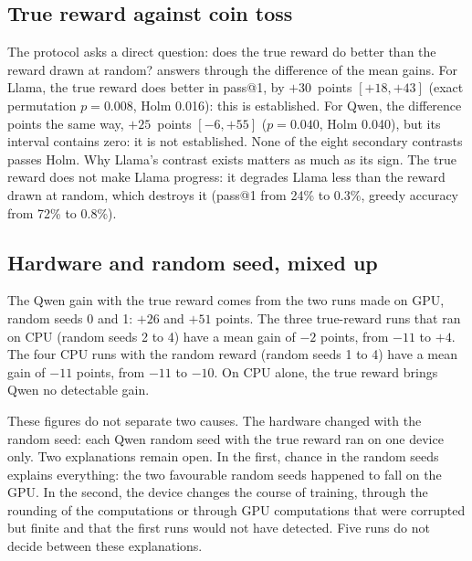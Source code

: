

\subsection{True reward against coin toss}

The protocol asks a direct question: does the true reward
do better than the reward drawn at random?  answers through the difference of the
mean gains. For Llama, the true reward does better in pass@1, by $+30$~points $[+18, +43]$ (exact
permutation $p = 0.008$, Holm 0.016): this is established. For Qwen, the difference points the same way,
$+25$~points $[-6, +55]$ ($p = 0.040$, Holm 0.040), but its interval contains zero: it is not
established. None of the eight secondary contrasts passes Holm. Why Llama's contrast exists matters as
much as its sign. The true reward does not make Llama progress: it degrades Llama less than the reward
drawn at random, which destroys it (pass@1 from 24\% to 0.3\%, greedy accuracy from 72\% to 0.8\%).


\subsection{Hardware and random seed, mixed up}
\label{sec:llm-materiel}

The Qwen gain with the true reward comes from the two runs made on GPU, random seeds 0 and 1: $+26$
and $+51$ points. The three true-reward runs that ran on CPU (random seeds 2 to 4) have a mean gain
of $-2$ points, from $-11$ to $+4$. The four CPU runs with the random reward (random seeds 1 to 4)
have a mean gain of $-11$ points, from $-11$ to $-10$. On CPU alone, the true reward brings Qwen no
detectable gain.

These figures do not separate two causes. The hardware changed with the random seed: each Qwen
random seed with the true reward ran on one device only. Two explanations remain open. In the
first, chance in the random seeds explains everything: the two favourable random seeds happened to
fall on the GPU. In the second, the device changes the course of training, through the rounding of the
computations or through GPU computations that were corrupted but finite and that the first runs
would not have detected. Five runs do not decide between these explanations.

